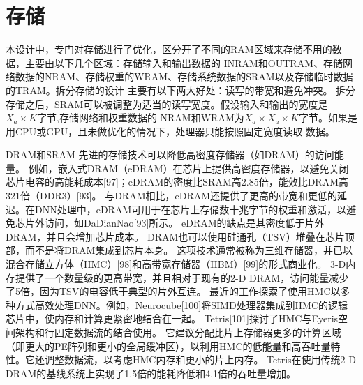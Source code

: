 


\section{存储}
本设计中，专门对存储进行了优化，区分开了不同的RAM区域来存储不用的数据，主要由以下几个区域：存储输入和输出数据的
INRAM和OUTRAM、存储网络数据的NRAM、存储权重的WRAM、存储系统数据的SRAM以及存储临时数据的TRAM。拆分存储的设计
主要有以下两大好处：读写的带宽和避免冲突。
拆分存储之后，SRAM可以被调整为适当的读写宽度。假设输入和输出的宽度是$X_a \times K$字节,存储网络和权重数据的
NRAM和WRAM为$X_a \times X_a \times K$字节。如果是用CPU或GPU，且未做优化的情况下，处理器只能按照固定宽度读取
数据。

DRAM和SRAM
先进的存储技术可以降低高密度存储器（如DRAM）的访问能量。
例如，嵌入式DRAM（eDRAM）在芯片上提供高密度存储器，以避免关闭芯片电容的高能耗成本[97]；eDRAM的密度比SRAM高2.85倍，能效比DRAM高321倍（DDR3）[93]。
与DRAM相比，eDRAM还提供了更高的带宽和更低的延迟。在DNN处理中，eDRAM可用于在芯片上存储数十兆字节的权重和激活，以避免芯片外访问，如DaDianNao[93]所示。
eDRAM的缺点是其密度低于片外DRAM，并且会增加芯片成本。
DRAM也可以使用硅通孔（TSV）堆叠在芯片顶部，而不是将DRAM集成到芯片本身。
这项技术通常被称为三维存储器，并已以混合存储立方体（HMC）[98]和高带宽存储器（HBM）[99]的形式商业化。
3-D内存提供了一个数量级的更高带宽，并且相对于现有的2-D DRAM，访问能量减少了5倍，因为TSV的电容低于典型的片外互连。
最近的工作探索了使用HMC以多种方式高效处理DNN。例如，Neurocube[100]将SIMD处理器集成到HMC的逻辑芯片中，使内存和计算更紧密地结合在一起。
Tetris[101]探讨了HMC与Eyeris空间架构和行固定数据流的结合使用。
它建议分配比片上存储器更多的计算区域（即更大的PE阵列和更小的全局缓冲区），以利用HMC的低能量和高吞吐量特性。它还调整数据流，以考虑HMC内存和更小的片上内存。
Tetris在使用传统2-D DRAM的基线系统上实现了1.5倍的能耗降低和4.1倍的吞吐量增加。

